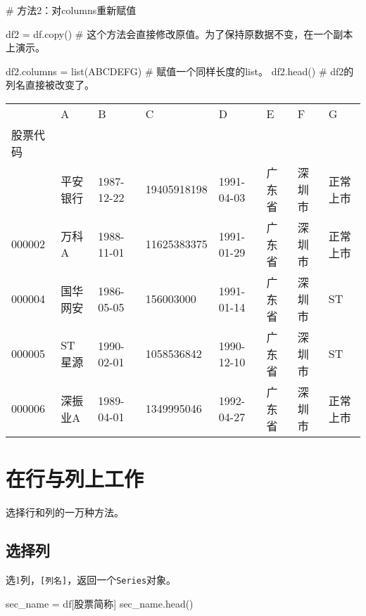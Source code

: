\documentclass[
  letterpaper,
  DIV=11,
  numbers=noendperiod]{scrreprt}
\newenvironment{Shaded}{\begin{snugshade}}{\end{snugshade}}
\newcommand{\BuiltInTok}[1]{\textcolor[rgb]{0.00,0.23,0.31}{#1}}
\newcommand{\CommentTok}[1]{\textcolor[rgb]{0.37,0.37,0.37}{#1}}
\newcommand{\NormalTok}[1]{\textcolor[rgb]{0.00,0.23,0.31}{#1}}
\newcommand{\OperatorTok}[1]{\textcolor[rgb]{0.37,0.37,0.37}{#1}}
\newcommand{\StringTok}[1]{\textcolor[rgb]{0.13,0.47,0.30}{#1}}
\begin{document}
\begin{Shaded}
\begin{Highlighting}[]
\CommentTok{\# 方法2：对columns重新赋值}

\NormalTok{df2 }\OperatorTok{=}\NormalTok{ df.copy() }\CommentTok{\# 这个方法会直接修改原值。为了保持原数据不变，在一个副本上演示。}

\NormalTok{df2.columns }\OperatorTok{=} \BuiltInTok{list}\NormalTok{(}\StringTok{\textquotesingle{}ABCDEFG\textquotesingle{}}\NormalTok{) }\CommentTok{\# 赋值一个同样长度的list。}
\NormalTok{df2.head() }\CommentTok{\# df2的列名直接被改变了。}
\end{Highlighting}
\end{Shaded}

\begin{longtable}[]{@{}llllllll@{}}
\toprule\noalign{}
& A & B & C & D & E & F & G \\
股票代码 & & & & & & & \\
\midrule\noalign{}
\endhead
\bottomrule\noalign{}
\endlastfoot
000001 & 平安银行 & 1987-12-22 & 19405918198 & 1991-04-03 & 广东省 &
深圳市 & 正常上市 \\
000002 & 万科A & 1988-11-01 & 11625383375 & 1991-01-29 & 广东省 & 深圳市
& 正常上市 \\
000004 & 国华网安 & 1986-05-05 & 156003000 & 1991-01-14 & 广东省 &
深圳市 & ST \\
000005 & ST 星源 & 1990-02-01 & 1058536842 & 1990-12-10 & 广东省 &
深圳市 & ST \\
000006 & 深振业A & 1989-04-01 & 1349995046 & 1992-04-27 & 广东省 &
深圳市 & 正常上市 \\
\end{longtable}

\hypertarget{ux5728ux884cux4e0eux5217ux4e0aux5de5ux4f5c}{%
\section{在行与列上工作}\label{ux5728ux884cux4e0eux5217ux4e0aux5de5ux4f5c}}

选择行和列的一万种方法。

\hypertarget{ux9009ux62e9ux5217}{%
\subsection{选择列}\label{ux9009ux62e9ux5217}}

选1列，\texttt{{[}列名{]}}，返回一个\texttt{Series}对象。

\begin{Shaded}
\begin{Highlighting}[]
\NormalTok{sec\_name }\OperatorTok{=}\NormalTok{ df[}\StringTok{\textquotesingle{}股票简称\textquotesingle{}}\NormalTok{]}
\NormalTok{sec\_name.head()}
\end{Highlighting}
\end{Shaded}
\end{document}
